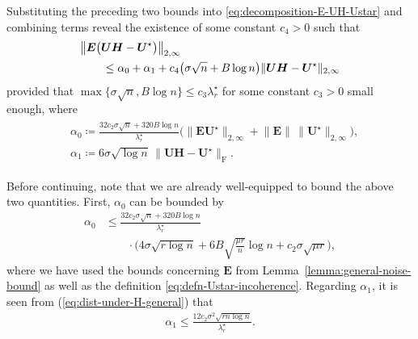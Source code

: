 Substituting the preceding two bounds into \eqref{eq:decomposition-E-UH-Ustar} and combining terms reveal the existence of some constant $c_4>0$ such that
%
\begin{align}
	&  \big\|\bm{E}\big(\bm{U}\bm{H}-\bm{U}^{\star}\big)\big\|_{2,\infty} \notag\\
	& \qquad \leq \alpha_0 + \alpha_1 + c_4\big( \sigma  \sqrt{n} + B\log n \big)\|\bm{U}\bm{H}-\bm{U}^{\star}\|_{2,\infty}
	\label{eq:El-UH-Ustar-UB-Bern123}
\end{align}
%
provided that $\max \{ \sigma \sqrt{n}, B\log n\} \leq c_3\lambda_r^{\star}$ for some constant $c_3>0$ small enough, where
\begin{align}
\begin{array}{ll}
 & \alpha_{0}\coloneqq\frac{32c_{2}\sigma\sqrt{n}+320B\log n}{\lambda_{r}^{\star}}\big(\big\|\bm{E}\bm{U}^{\star}\big\|_{2,\infty}+\big\|\bm{E}\big\|\,\big\|\bm{U}^{\star}\big\|_{2,\infty}\big) , \\
 & \alpha_{1}\coloneqq6\sigma\sqrt{\log n}\,\|\bm{U}\bm{H}-\bm{U}^{\star}\|_{\mathrm{F}} .
\end{array}	
\label{eq:defn-alpha-0-1-general}
\end{align}
%


Before continuing,  note that we are already well-equipped to bound the above two quantities. First, $\alpha_0$ can be bounded by
%
\begin{align}
\alpha_{0} & \leq \frac{32c_{2}\sigma\sqrt{n}+320B\log n}{\lambda_{r}^{\star}}\nonumber \\
 & \qquad\cdot\Big(4\sigma\sqrt{r\log n}+6B\sqrt{\frac{\mu r}{n}}\log n+c_{2}\sigma\sqrt{\mu r}\Big),
\label{eq:defn-alpha-0-general}
\end{align}
%
where we have used the bounds concerning $\bm{E}$ from Lemma~\ref{lemma:general-noise-bound} as well as the definition \eqref{eq:defn-Ustar-incoherence}.
Regarding $\alpha_1$, it is seen from (\ref{eq:dist-under-H-general}) that
%
\begin{align}
\alpha_{1}
  \leq\frac{12c_{2}\sigma^{2}\sqrt{rn\log n}}{\lambda_{r}^{\star}}.
	\label{eq:alpha1-bound-1234}
\end{align}




